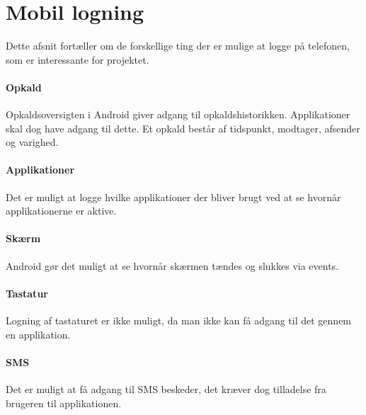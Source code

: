 \section{Mobil logning}\label{logning}
Dette afsnit fortæller om de forskellige ting der er mulige at logge på telefonen, som er interessante for projektet.

\paragraph{Opkald}
Opkaldsoversigten i Android giver adgang til opkaldshistorikken.
Applikationer skal dog have adgang til dette.
Et opkald består af tidspunkt, modtager, afsender og varighed.

\paragraph{Applikationer}
Det er muligt at logge hvilke applikationer der bliver brugt ved at se hvornår applikationerne er aktive.

\paragraph{Skærm}
Android gør det muligt at se hvornår skærmen tændes og slukkes via events.  

\paragraph{Tastatur}
Logning af tastaturet er ikke muligt, da man ikke kan få adgang til det gennem en applikation.

\paragraph{SMS}
Det er muligt at få adgang til SMS beskeder, det kræver dog tilladelse fra brugeren til applikationen.